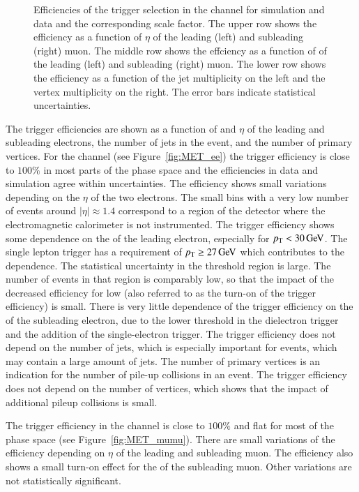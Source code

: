 \begin{figure}[htbp!]
\begin{center}
      \caption{Efficiencies of the trigger selection in the \emu channel for simulation and data and the corresponding scale factor. The upper row shows the efficiency as a function of $\eta$ of the leading (left) and subleading (right) muon. The middle row shows the effciency as a function of \pt of the leading (left) and subleading (right) muon. The lower row shows the efficiency as a function of the jet multiplicity on the left and the vertex multiplicity on the right.
      The error bars indicate statistical uncertainties. }  
      
    \label{fig:MET_emu}
  \end{center}
\end{figure}

The trigger efficiencies are shown as a function of \pt and $\eta$ of the leading and subleading electrons, the number of jets in the event, and the number of primary vertices. 
For the \ee channel (see Figure~\ref{fig:MET_ee}) the trigger efficiency is close to $100\%$ in most parts of the phase space and the efficiencies in data and simulation agree within uncertainties. The
efficiency shows small variations depending on the $\eta$ of the two electrons.
The small bins with a very low number of events around $|\eta| \approx 1.4$ correspond to a region of the detector where the electromagnetic calorimeter is not instrumented.
The trigger efficiency shows some dependence on the \pt of the leading electron, especially for $p_{\mathrm{T}}<30\,\text{Ge\hspace{-.08em}V}$. The single lepton trigger has a requirement of $p_{\mathrm{T}} \geq 27 \,\text{Ge\hspace{-.08em}V}$ which contributes to the \pt dependence.
The statistical uncertainty in the threshold region is large. The number of \ttbar events in that region is comparably low, so that the impact of the decreased efficiency for low \pt (also referred to as the turn-on of the trigger efficiency) is small. 
There is very little dependence of the trigger efficiency on the \pt of the subleading electron, due to the lower threshold in the dielectron trigger and the addition of the single-electron trigger.
The trigger efficiency does not depend on the number of jets, which is especially important for \ttbar events, which may contain a large amount of jets.
The number of primary vertices is an indication for the number of pile-up collisions in an event. The trigger efficiency does not depend on the number of vertices,
which shows that the impact of additional pileup collisions is small.

The trigger efficiency in the \mumu channel is close to $100\%$ and flat for most of the phase space (see Figure~\ref{fig:MET_mumu}). There are small variations of the efficiency depending on $\eta$ of the leading and subleading
muon. The efficiency also shows a small turn-on effect for the \pt of the subleading muon. Other variations are not statistically significant.

